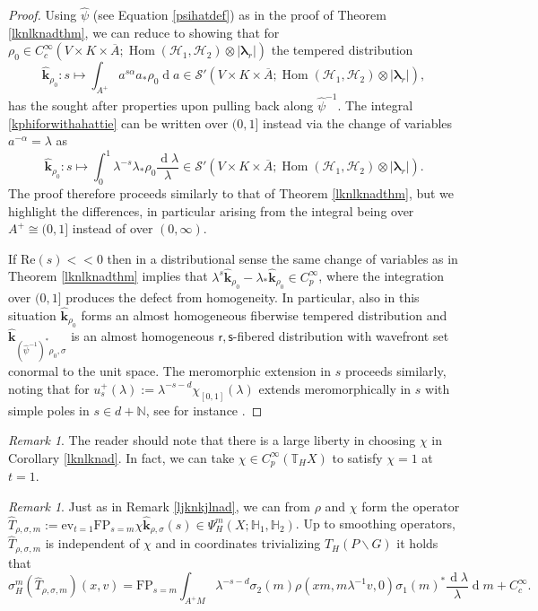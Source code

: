 \documentclass[a4paper,reqno]{amsart}
\numberwithin{equation}{section}
\def\Hom{\operatorname{Hom}}
\def\rd{\operatorname{d}\!}
\def\N{\mathbb{N}}
\def\T{\mathbb{T}}
\theoremstyle{definition}
\theoremstyle{remark}
\newtheorem{remark}[thm]{Remark}
\begin{document}
\begin{proof}
Using $\hat{\psi}$ (see Equation \eqref{psihatdef}) as in the proof of Theorem \ref{lknlknadthm}, we can reduce to showing that for $\rho_0\in C^\infty_c(V\times K\times \overline{A}; \Hom(\mathcal{H}_1,\mathcal{H}_2)\otimes |\pmb{\lambda}_r|)$ the tempered distribution
\begin{equation}
\label{kphiforwithahattie}
\hat{\pmb{k}}_{\rho_0}:s\mapsto \int_{A^+} a^{s\alpha }a_*\rho_0 \rd a\in \mathcal{S}'(V\times K\times \overline{A}; \Hom(\mathcal{H}_1,\mathcal{H}_2)\otimes |\pmb{\lambda}_r|),
\end{equation}
has the sought after properties upon pulling back along $\hat{\psi}^{-1}$. The integral \eqref{kphiforwithahattie} can be written over $(0,1]$ instead via the change of variables $a^{-\alpha}=\lambda$ as
$$\hat{\pmb{k}}_{\rho_0}:s\mapsto \int_{0}^1 \lambda^{-s}\lambda_*\rho_0 \frac{\rd \lambda}{\lambda}\in \mathcal{S}'(V\times K\times \overline{A}; \Hom(\mathcal{H}_1,\mathcal{H}_2)\otimes |\pmb{\lambda}_r|).$$
The proof therefore proceeds similarly to that of Theorem \ref{lknlknadthm}, but we highlight the differences, in particular arising from the integral being over $A^+\cong (0,1]$ instead of over $(0,\infty)$. 


If $\mathrm{Re}(s)<<0$ then in a distributional sense the same change of variables as in Theorem \ref{lknlknadthm} implies that $\lambda^s\hat{\pmb{k}}_{\rho_0}-\lambda_*\hat{\pmb{k}}_{\rho_0}\in C^\infty_p$, where the integration over $(0,1]$ produces the defect from homogeneity. In particular, also in this situation $\hat{\pmb{k}}_{\rho_0}$ forms an almost homogeneous fiberwise tempered distribution and $\hat{\pmb{k}}_{(\hat{\psi}^{-1})^*\rho_0,\sigma}$ is an almost homogeneous $\mathsf{r},\mathsf{s}$-fibered distribution with wavefront set conormal to the unit space. The meromorphic extension in $s$ proceeds similarly, noting that for $u_s^+(\lambda):= \lambda^{-s-d}\chi_[0,1](\lambda)$ extends meromorphically in $s$ with simple poles in $s\in d+\N$, see for instance \cite{horI}.


\end{proof}


\begin{remark}
\label{nochi}
The reader should note that there is a large liberty in choosing $\chi$ in Corollary \ref{lknlknad}. In fact, we can take $\chi\in C^\infty_p(\T_HX)$ to satisfy $\chi=1$ at $t=1$.
\end{remark}

\begin{remark}
\label{ljknkjlnadbd}
Just as in Remark \ref{ljknkjlnad}, we can from $\rho$ and $\chi$ form the operator $\hat{T}_{\rho,\sigma,m}:=\mathrm{ev}_{t=1}\mathrm{FP}_{s=m}\chi \hat{\pmb{k}}_{\rho,\sigma}(s)\in \Psi^m_H(X;\mathbb{H}_1,\mathbb{H}_2)$. Up to smoothing operators, $\hat{T}_{\rho,\sigma,m}$ is independent of $\chi$ and in coordinates trivializing $T_H(P\backslash G)$ it holds that 
$$\sigma_H^m(\hat{T}_{\rho,\sigma,m})(x,v)=\mathrm{FP}_{s=m}\int_{A^+M} \lambda^{-s-d}\sigma_2(m)\rho(xm,m\lambda^{-1}v,0)\sigma_1(m)^* \frac{\rd \lambda}{\lambda}\rd m+C^\infty_c.$$
\end{remark}
\end{document}
